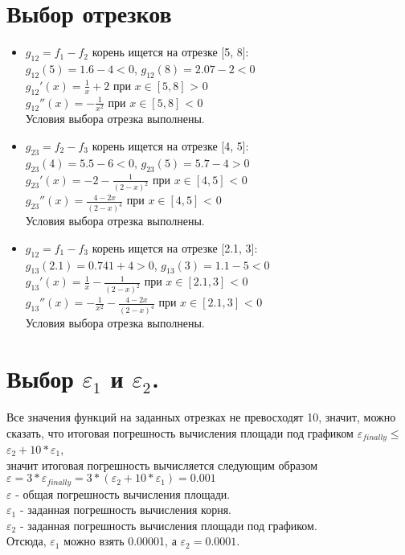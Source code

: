 \documentclass[a4paper,12pt,titlepage,finall]{article}
\begin{document}
\section{Выбор отрезков}
\begin{itemize}
\item $g_{12} = f_1 - f_2$ корень ищется на отрезке [5, 8]:\\
$g_{12}(5)=1.6 - 4 < 0$, $g_{12}(8)= 2.07 - 2 < 0$\\
$g_{12}'(x) = \frac{1}{x} + 2 $ при $x \in{[5, 8]}$ > 0\\
$g_{12}''(x) = -\frac{1}{x^2}$ при $x \in{[5, 8]}$ < 0\\
Условия выбора отрезка выполнены.
\item  $g_{23} = f_2 - f_3$ корень ищется на отрезке [4, 5]:\\
$g_{23}(4)=5.5 - 6 < 0$, $g_{23}(5)= 5.7 - 4 > 0$\\
$g_{23}'(x) = -2 - \frac{1}{(2-x)^2}$ при $x \in{[4, 5]}$ < 0\\
$g_{23}''(x) = \frac{4-2x}{(2-x)^4}$ при $x \in{[4, 5]}$ < 0\\
Условия выбора отрезка выполнены.
\item  $g_{12} = f_1 - f_3$ корень ищется на отрезке [2.1, 3]:\\
$g_{13}(2.1)= 0.741 + 4 > 0$, $g_{13}(3)= 1.1 - 5 < 0$\\
$g_{13}'(x) =  \frac{1}{x} - \frac{1}{(2-x)^2}$ при $x \in{[2.1, 3]}$ < 0\\
$g_{13}''(x) = -\frac{1}{x^2} - \frac{4-2x}{(2-x)^4}$ при $x \in{[2.1, 3]}$ < 0\\
Условия выбора отрезка выполнены.
\end{itemize}
\section{Выбор $\varepsilon_1$  и $\varepsilon_2$.} 

Все значения функций на заданных отрезках не превосходят 10, значит, можно сказать, что итоговая погрешность вычисления площади под графиком $\varepsilon_{finally}\leq$ $\varepsilon_2 + 10*\varepsilon_1$,\\ значит итоговая погрешность вычисляется следующим образом\\ $\varepsilon = 3*\varepsilon_{finally} = 3*(\varepsilon_2 + 10*\varepsilon_1) = 0.001$\\
$\varepsilon$ - общая погрешность вычисления площади.\\
$\varepsilon_1$ - заданная погрешность вычисления корня.\\
$\varepsilon_2$ - заданная погрешность вычисления площади под графиком.\\
Отсюда, $\varepsilon_1$ можно взять 0.00001, а $\varepsilon_2 = 0.0001$.
\newpage
\end{document}
